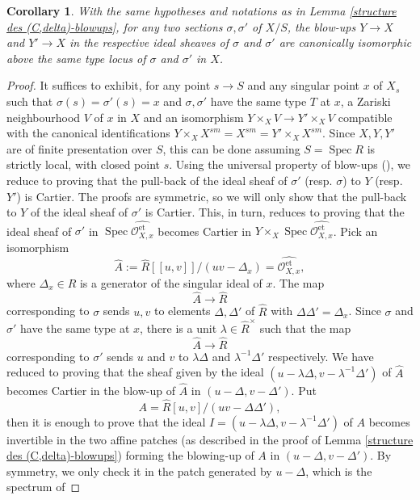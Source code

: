 \documentclass[a4paper,12pt]{amsart} %
\numberwithin{equation}{subsection}
\newcommand{\on}[1]{\operatorname{#1}}
\newcommand{\Spec}{\operatorname{Spec}}
\theoremstyle{definition}
\theoremstyle{plain}%
\newtheorem{corollary}[definition]{Corollary}
\theoremstyle{remark}
\renewcommand{\O}{\mathcal{O}}
\begin{document}
\begin{corollary}\label{corollary:unicite_zariski_locale_des_T-refinements}
With the same hypotheses and notations as in Lemma \ref{structure des (C,delta)-blowups}, for any two sections $\sigma,\sigma'$ of $X/S$, the blow-ups $Y\to X$ and $Y'\to X$ in the respective ideal sheaves of $\sigma$ and $\sigma'$ are canonically isomorphic above the same type locus of $\sigma$ and $\sigma'$ in $X$.
\end{corollary}

\begin{proof}
It suffices to exhibit, for any point $s\to S$ and any singular point $x$ of $X_s$ such that $\sigma(s)=\sigma'(s)=x$ and $\sigma,\sigma'$ have the same type $T$ at $x$, a Zariski neighbourhood $V$ of $x$ in $X$ and an isomorphism $Y\times_X V \to Y'\times_X V$ compatible with the canonical identifications $Y\times_X X^{sm}=X^{sm}=Y'\times_X X^{sm}$. Since $X,Y,Y'$ are of finite presentation over $S$, this can be done assuming $S=\Spec R$ is strictly local, with closed point $s$. Using the universal property of blow-ups (\cite[\href{https://stacks.math.columbia.edu/tag/0806}{Tag 0806}]{stacks-project}), we reduce to proving that the pull-back of the ideal sheaf of $\sigma'$ (resp. $\sigma$) to $Y$ (resp. $Y'$) is Cartier. The proofs are symmetric, so we will only show that the pull-back to $Y$ of the ideal sheaf of $\sigma'$ is Cartier. This, in turn, reduces to proving that the ideal sheaf of $\sigma'$ in $\Spec\widehat{\O_{X,x}^{\on{et}}}$ becomes Cartier in $Y\times_X \Spec\widehat{\O_{X,x}^{\on{et}}}$. Pick an isomorphism
\[
\widehat{A}:=\widehat{R}[[u,v]]/(uv-\Delta_x)=\widehat{\O_{X,x}^{\on{et}}},
\]
where $\Delta_x\in R$ is a generator of the singular ideal of $x$. The map
\[
\widehat A \to \widehat{R}
\]
corresponding to $\sigma$ sends $u,v$ to elements $\Delta,\Delta'$ of $\widehat{R}$ with $\Delta\Delta'=\Delta_x$. Since $\sigma$ and $\sigma'$ have the same type at $x$, there is a unit $\lambda\in\widehat{R}^\times$ such that the map
\[
\widehat A \to \widehat{R}
\]
corresponding to $\sigma'$ sends $u$ and $v$ to $\lambda\Delta$ and $\lambda^{-1}\Delta'$ respectively. We have reduced to proving that the sheaf given by the ideal $(u-\lambda\Delta, v-\lambda^{-1}\Delta')$ of $\widehat A$ becomes Cartier in the blow-up of $\widehat{A}$ in $(u-\Delta,v-\Delta')$. Put
\[
A=\widehat{R}[u,v]/(uv-\Delta\Delta'),
\]
then it is enough to prove that the ideal $I=(u-\lambda\Delta, v-\lambda^{-1}\Delta')$ of $A$ becomes invertible in the two affine patches (as described in the proof of Lemma \ref{structure des (C,delta)-blowups}) forming the blowing-up of $A$ in $(u-\Delta,v-\Delta')$. By symmetry, we only check it in the patch generated by $u-\Delta$, which is the spectrum of

\end{proof}
\end{document}
